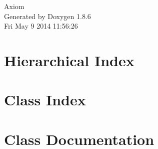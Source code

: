 \documentclass[twoside]{book}
\newcommand{\clearemptydoublepage}{%
  \newpage{\pagestyle{empty}\cleardoublepage}%
}
\begin{document}
\hypersetup{pageanchor=false}
\begin{titlepage}
\vspace*{7cm}
\begin{center}%
{\Large Axiom }\\
\vspace*{1cm}
{\large Generated by Doxygen 1.8.6}\\
\vspace*{0.5cm}
{\small Fri May 9 2014 11:56:26}\\
\end{center}
\end{titlepage}
\clearemptydoublepage
\tableofcontents
\clearemptydoublepage
{}
\hypersetup{pageanchor=true}

\chapter{Hierarchical Index}

\chapter{Class Index}

\chapter{Class Documentation}



















































\newpage
{}
{}
\printindex
\end{document}
